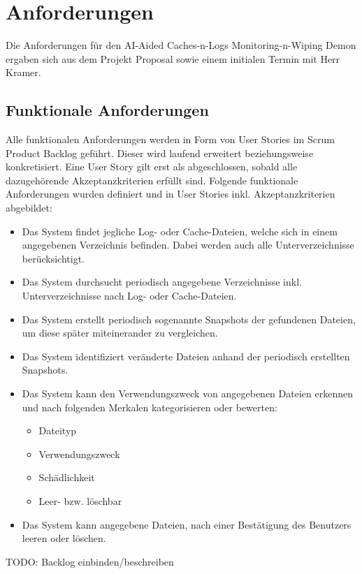 \documentclass[a4paper,12pt]{report}
\begin{document}
    \clearpage


    \section{Anforderungen}
    Die Anforderungen für den AI-Aided Caches-n-Logs Monitoring-n-Wiping Demon ergaben sich aus dem Projekt Proposal sowie einem initialen Termin mit Herr Kramer.

    \subsection{Funktionale Anforderungen}

    Alle funktionalen Anforderungen werden in Form von User Stories im Scrum Product Backlog geführt. Dieser wird laufend erweitert beziehungsweise konkretisiert. Eine User Story gilt erst als abgeschlossen, sobald alle dazugehörende Akzeptanzkriterien erfüllt sind. Folgende funktionale Anforderungen wurden definiert und in User Stories inkl. Akzeptanzkriterien abgebildet:
    \begin{itemize}
        \item Das System findet jegliche Log- oder Cache-Dateien, welche sich in einem angegebenen Verzeichnis befinden. Dabei werden auch alle Unterverzeichnisse berücksichtigt.
        \item Das System durchsucht periodisch angegebene Verzeichnisse inkl. Unterverzeichnisse nach Log- oder Cache-Dateien.
        \item Das System erstellt periodisch sogenannte Snapshots der gefundenen Dateien, um diese später miteinerander zu vergleichen.
        \item Das System identifiziert veränderte Dateien anhand der periodisch erstellten Snapshots.
        \item Das System kann den Verwendungszweck von angegebenen Dateien erkennen und nach folgenden Merkalen kategorisieren oder bewerten:
        \begin{itemize}
            \item Dateityp
            \item Verwendungszweck
            \item Schädlichkeit
            \item Leer- bzw. löschbar
        \end{itemize}
        \item Das System kann angegebene Dateien, nach einer Bestätigung des Benutzers leeren oder löschen.
    \end{itemize}
    TODO: Backlog einbinden/beschreiben
\end{document}
